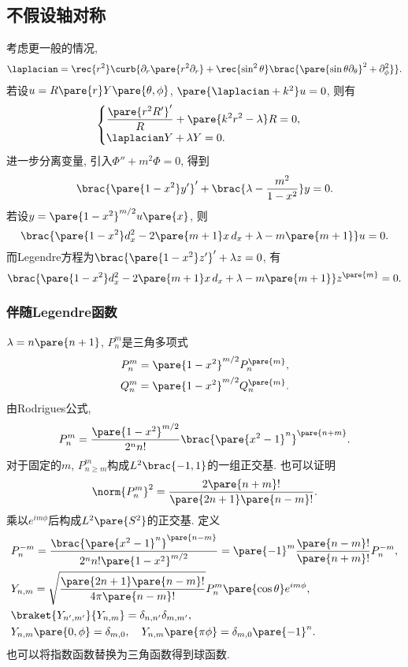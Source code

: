 \documentclass[hidelinks]{ctexart}
\begin{document}

\subsection{不假设轴对称} %
\label{sub:不假设轴对称}

考虑更一般的情况,
\[ \laplacian = \rec{r^2}\curb{\partial_r \pare{r^2\partial_r} + \rec{\sin^2\theta}\brac{\pare{\sin\theta \partial_\theta}^2 + \partial_\phi^2}}. \]
若设$u = R\pare{r} Y\pare{\theta,\phi}$, $\pare{\laplacian + k^2} u = 0$, 则有
\[ \begin{cases}
    \displaystyle \frac{\pare{r^2R'}'}{R} + \pare{k^2 r^2 - \lambda} R = 0, \\
    \laplacian Y + \lambda Y = 0.
\end{cases} \]
进一步分离变量, 引入$\Phi'' + m^2\Phi = 0$, 得到
\[ \brac{\pare{1-x^2}y'}' + \brac{\lambda - \frac{m^2}{1-x^2}}y = 0. \]
若设$y = \pare{1-x^2}^{m/2} u\pare{x}$, 则
\[ \brac{\pare{1-x^2}d_x^2 - 2\pare{m+1}x\,d_x + \lambda - m\pare{m+1}}u = 0. \]
而Legendre方程为$\brac{\pare{1-x^2}z'}' + \lambda z=  0$, 有
\[ \brac{\pare{1-x^2}d_x^2 - 2\pare{m+1}x\,d_x + \lambda - m\pare{m+1}}z^{\pare{m}} = 0. \]

\subsubsection{伴随Legendre函数} %
\label{ssub:伴随legendre函数}

$\lambda = n\pare{n+1}$, $P_n^m$是三角多项式
\begin{align*}
    P_n^m = \pare{1-x^2}^{m/2}P_n^{\pare{m}}, \\
    Q_n^m = \pare{1-x^2}^{m/2}Q_n^{\pare{m}}.
\end{align*}
由Rodrigues公式,
\[ P_n^m = \frac{\pare{1-x^2}^{m/2}}{2^n n!}\brac{\pare{x^2-1}^n}^{\pare{n+m}}. \]
对于固定的$m$, $P_{n\ge m}^m$构成$L^2\brac{-1,1}$的一组正交基. 也可以证明
\[ \norm{P_n^m}^2 = \frac{2\pare{n+m}!}{\pare{2n+1}\pare{n-m}!}. \]
乘以$e^{im\phi}$后构成$L^2\pare{S^2}$的正交基. 定义
\begin{align*}
    & P_n^{-m} = \frac{\brac{\pare{x^2-1}^n}^{\pare{n-m}}}{2^n n!\pare{1-x^2}^{m/2}} = \pare{-1}^m \frac{\pare{n-m}!}{\pare{n+m}!}P_n^{-m}, \\
    & Y_{n,m} = \sqrt{\frac{\pare{2n+1}\pare{n-m}!}{4\pi\pare{n-m}!}} P_n^m\pare{\cos\theta} e^{im\phi}, \\
    & \braket{Y_{n',m'}}{Y_{n,m}} = \delta_{n,n'}\delta_{m,m'},\\
    & Y_{n,m}\pare{0,\phi} = \delta_{m,0},\quad Y_{n,m}\pare{\pi\phi} = \delta_{m,0}\pare{-1}^n.
\end{align*}
也可以将指数函数替换为三角函数得到球函数.
\end{document}
